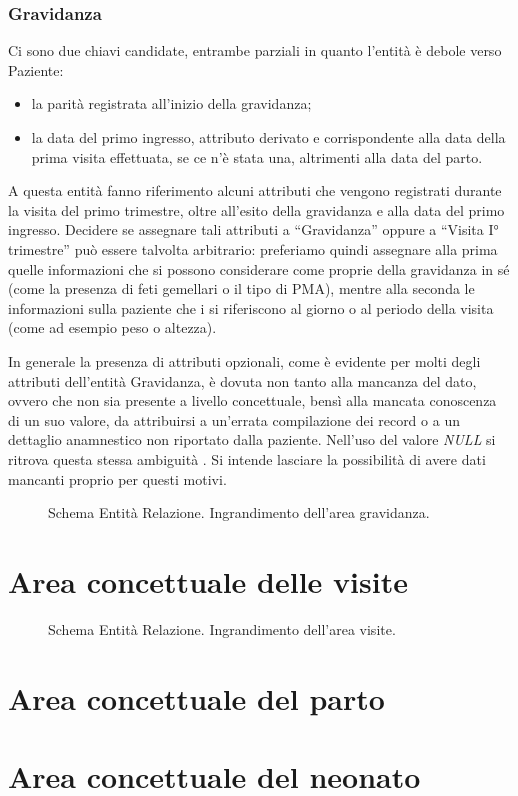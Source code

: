 \subsubsection{Gravidanza}

Ci sono due chiavi candidate, entrambe parziali in quanto l'entità è debole verso Paziente:
\begin{itemize}
\item la parità registrata all'inizio della gravidanza;
\item la data del primo ingresso, attributo derivato e corrispondente alla data della prima visita effettuata, se ce n'è stata una, altrimenti alla data del parto.
\end{itemize}

A questa entità fanno riferimento alcuni attributi che vengono registrati durante la visita del primo trimestre, oltre all'esito della gravidanza e alla data del primo ingresso.
Decidere se assegnare tali attributi a \enquote{Gravidanza} oppure a \enquote{Visita I° trimestre} può essere talvolta arbitrario: preferiamo quindi assegnare alla prima quelle informazioni che si possono considerare come proprie della gravidanza in sé (come la presenza di feti gemellari o il tipo di PMA), mentre alla seconda le informazioni sulla paziente che i si riferiscono al giorno o al periodo della visita (come ad esempio peso o altezza).

In generale la presenza di attributi opzionali, come è evidente per molti degli attributi dell'entità Gravidanza, è dovuta non tanto alla mancanza del dato, ovvero che non sia presente a livello concettuale, bensì alla mancata conoscenza di un suo valore, da attribuirsi a un'errata compilazione dei record o a un dettaglio anamnestico non riportato dalla paziente.
Nell'uso del valore \emph{NULL} si ritrova questa stessa ambiguità \cite{Sil11}.
Si intende lasciare la possibilità di avere dati mancanti proprio per questi motivi.

\begin{figure}
    \centering
    
    \caption{Schema Entità Relazione. Ingrandimento dell'area gravidanza.}
    \label{pregnancyerdiagram}
\end{figure}

\section{Area concettuale delle visite}

\begin{figure}
    \centering
    
    \caption{Schema Entità Relazione. Ingrandimento dell'area visite.}
    \label{visitserdiagram}
\end{figure}


\section{Area concettuale del parto}

\section{Area concettuale del neonato}